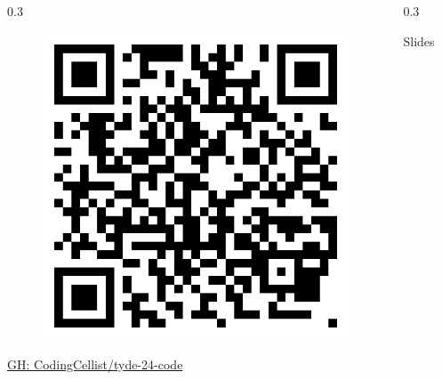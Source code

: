 \documentclass[compress,handout]{beamer}
\begin{document}
\begin{frame}
\begin{columns}
\begin{column}{0.3\framewidth}
\begin{center}
\begin{figure}
        \includegraphics[width=\textwidth]{code-qr.png}
      \end{figure}
      \href{https://github.com/CodingCellist/tyde-24-code}{GH: CodingCellist/tyde-24-code}
    \end{center}
  \end{column}
  \begin{column}{0.3\framewidth}
    \begin{center}
      Slides
      \begin{figure}
      \end{figure}
    \end{center}
  \end{column}
  \end{columns}


\end{frame}
\end{document}
